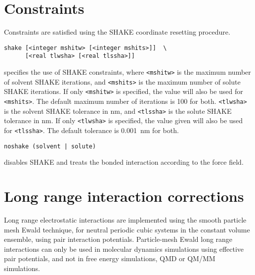 \section{Constraints}
Constraints are satisfied using the SHAKE 
coordinate resetting procedure.
\begin{description}

\item
\begin{verbatim}
shake [<integer mshitw> [<integer mshits>]]  \
      [<real tlwsha> [<real tlssha>]]
\end{verbatim}
specifies the use of SHAKE constraints,
where \verb+<mshitw>+ is the maximum number of solvent SHAKE iterations,
and \verb+<mshits>+ is the maximum number of solute SHAKE iterations. If
only \verb+<mshitw>+ is specified, the value will also be used for \verb+<mshits>+.
The default maximum number of iterations is 100 for both.
\verb+<tlwsha>+ is the solvent SHAKE tolerance in nm, and \verb+<tlssha>+ is
the solute SHAKE tolerance in nm. If only \verb+<tlwsha>+ is specified, the
value given will also be used for \verb+<tlssha>+. The default tolerance
is 0.001~nm for both.

\item
\begin{verbatim}
noshake (solvent | solute)
\end{verbatim}
disables SHAKE and treats the bonded interaction according to the force 
field.

\end{description}

\section{Long range interaction corrections}
Long range electrostatic interactions are implemented using the
smooth particle mesh Ewald technique, for neutral periodic cubic systems in
the constant volume ensemble, using pair interaction potentials. Particle-mesh
Ewald long range interactions can only be used in molecular dynamics simulations
using effective pair potentials, and not in free energy simulations, QMD or
QM/MM simulations.

